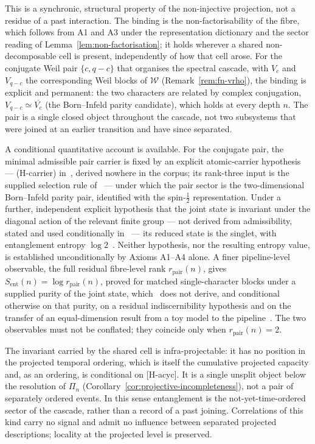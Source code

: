 \documentclass[11pt,a4paper]{article}
\begin{document}
    This is a synchronic, structural property of the non-injective projection, not a residue of a past
    interaction.
    The binding is the non-factorisability of the fibre, which follows from A1 and A3 under the representation
    dictionary and the sector reading of Lemma~\ref{lem:non-factorisation};
    it holds wherever a shared non-decomposable cell is present, independently of how that cell arose.
    For the conjugate Weil pair $\{c,q-c\}$ that organises the spectral cascade, with $V_c$ and $V_{q-c}$ the
    corresponding Weil blocks of $\mathcal{W}$ (Remark~\ref{rem:fn-vrho}), the binding is explicit and
    permanent: the two characters are related by complex conjugation,
    $V_{q-c}\simeq\overline{V_c}$ (the Born--Infeld parity candidate), which holds at every depth $n$.
    The pair is a single closed object throughout the cascade, not two subsystems that were joined at an
    earlier transition and have since separated.

    A conditional quantitative account is available. For the conjugate pair, the minimal admissible
    pair carrier is fixed by an explicit atomic-carrier hypothesis — (H-carrier)
    in~\cite{Beau2026ent2}, derived nowhere in the corpus; its rank-three input is the supplied
    selection rule of~\cite{Beau2026a27} — under which the pair sector is the two-dimensional
    Born--Infeld parity pair, identified with the spin-$\tfrac12$ representation. Under a further,
    independent explicit hypothesis that the joint state is invariant under the diagonal action of
    the relevant finite group — not derived from admissibility, stated and used conditionally
    in~\cite{Beau2026q3} — its reduced state is the singlet, with entanglement entropy
    $\log 2$~\cite{Beau2026ent2}. Neither hypothesis, nor the resulting entropy value, is
    established unconditionally by Axioms A1--A4 alone.
    A finer pipeline-level observable, the full residual fibre-level rank $r_{\mathrm{pair}}(n)$, gives
    $S_{\mathrm{ent}}(n)=\log r_{\mathrm{pair}}(n)$, proved for matched single-character blocks under a supplied
    purity of the joint state, which~\cite{Beau2026ent1} does not derive, and conditional otherwise on that purity,
    on a residual indiscernibility hypothesis and on the transfer of an equal-dimension result from a toy model
    to the pipeline~\cite{Beau2026entnote,Beau2026ent1,Beau2026ent2}.
    The two observables must not be conflated; they coincide only when $r_{\mathrm{pair}}(n)=2$.

    The invariant carried by the shared cell is infra-projectable: it has no position in the projected
    temporal ordering, which is itself the cumulative projected capacity and, as an ordering, is
    conditional on \textup{[H-acyc]}.
    It is a single unsplit object below the resolution of $\Pi_n$ (Corollary~\ref{cor:projective-incompleteness}),
    not a pair of separately ordered events.
    In this sense entanglement is the not-yet-time-ordered sector of the cascade, rather than a record of a past
    joining.
    Correlations of this kind carry no signal and admit no influence between separated projected descriptions;
    locality at the projected level is preserved.
\end{document}

